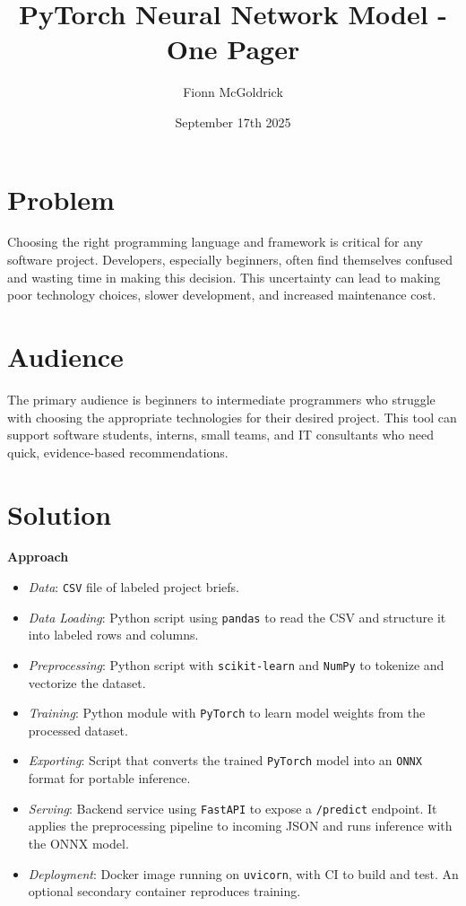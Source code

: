 \documentclass{article}
\title{PyTorch Neural Network Model - One Pager}
\author{Fionn McGoldrick}
\date{September 17th 2025}
\begin{document}
\maketitle

\section{Problem}
Choosing the right programming language and framework is critical for any software project. Developers, especially beginners, often find themselves confused and wasting time in making this decision. This uncertainty can lead to making poor technology choices, slower development, and increased maintenance cost.

\section{Audience}
The primary audience is beginners to intermediate programmers who struggle with choosing the appropriate technologies for their desired project. This tool can support software students, interns, small teams, and IT consultants who need quick, evidence-based recommendations.  

\section{Solution}
\textbf{Approach}
\begin{itemize}
    \item \emph{Data}: \texttt{CSV} file of labeled project briefs.
    \item \emph{Data Loading}: Python script using \texttt{pandas} to read the CSV and structure it into labeled rows and columns.
    \item \emph{Preprocessing}: Python script with \texttt{scikit-learn} and \texttt{NumPy} to tokenize and vectorize the dataset.
    \item \emph{Training}: Python module with \texttt{PyTorch} to learn model weights from the processed dataset.
    \item \emph{Exporting}: Script that converts the trained \texttt{PyTorch} model into an \texttt{ONNX} format for portable inference.
    \item \emph{Serving}: Backend service using \texttt{FastAPI} to expose a \texttt{/predict} endpoint. It applies the preprocessing pipeline to incoming JSON and runs inference with the ONNX model.
    \item \emph{Deployment}: Docker image running on \texttt{uvicorn}, with CI to build and test. An optional secondary container reproduces training.
\end{itemize}
\end{document}
